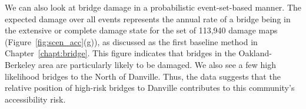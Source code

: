 We can also look at bridge damage in a probabilistic event-set-based manner. The expected damage over all events represents the annual rate of a bridge being in the extensive or complete damage state for the set of 113,940 damage maps (Figure~\ref{fig:scen_acc}{(g)}), as discussed as the first baseline method in Chapter~\ref{chapt:bridge}. This figure indicates that bridges in the Oakland-Berkeley area are particularly likely to be damaged. We also see a few high likelihood bridges to the North of Danville. Thus, the data suggests that the relative position of high-risk bridges to Danville contributes to this community's accessibility risk.



